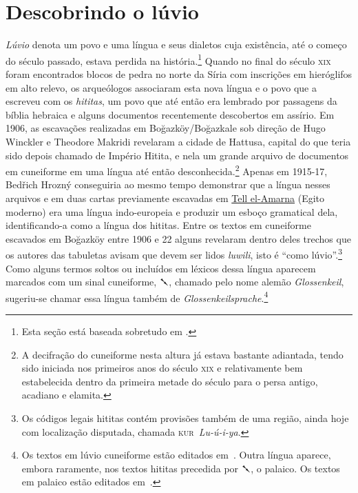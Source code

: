 
\section{Descobrindo o lúvio}

\emph{Lúvio} denota um povo e uma língua e seus dialetos cuja existência,
até o começo do século passado, estava perdida na história.\footnote{Esta seção
	está baseada sobretudo em \textcite{CHLI11,Melchert2003,Hoffner2008}.}
Quando no final do século \textsc{xix} foram encontrados blocos de pedra no
norte da Síria com inscrições em hieróglifos em alto relevo, os arqueólogos associaram esta
nova língua e o povo que a escreveu com os \emph{hititas}, um povo que até
então era lembrado por passagens da bíblia hebraica e alguns documentos
recentemente descobertos em assírio.
Em 1906, as escavações realizadas em Boğazköy\slash{}Boğazkale sob direção de
Hugo Winckler e Theodore Makridi revelaram a cidade de Hattusa,
capital do que teria sido depois chamado de Império Hitita, e nela um grande
arquivo de documentos em cuneiforme em uma língua até então
desconhecida.\footnote{A decifração do cuneiforme nesta altura já estava
	bastante adiantada, tendo sido iniciada nos primeiros anos do século
	\textsc{xix} e relativamente bem estabelecida dentro da primeira metade do
	século para o persa antigo, acadiano e elamita.}
Apenas em 1915-17, Bedřich Hrozný conseguiria ao mesmo tempo demonstrar que a
língua nesses arquivos e em duas cartas previamente escavadas em
\href{https://pleiades.stoa.org/places/149576487}{Tell el-Amarna}
(Egito moderno) era uma língua indo-europeia e produzir um esboço gramatical
dela, identificando-a como a língua dos hititas.
Entre os textos em cuneiforme escavados em Boğazköy entre 1906 e 22 alguns revelaram
dentro deles trechos que os autores das tabuletas avisam que devem ser lidos
\emph{luwili}, isto é ``como lúvio''.\footnote{Os códigos legais hititas
	contém provisões também de uma região, ainda hoje
	com localização disputada, chamada \mbox{\textsc{kur} \textit{Lu-ú-i-ya}}.}
Como alguns termos soltos ou incluídos em léxicos dessa língua
aparecem marcados com um sinal cuneiforme, \foreignlanguage{hittite}{𒃵}, chamado
pelo nome alemão \emph{Glossenkeil}, sugeriu-se chamar essa língua também de
\emph{Glossenkeilsprache}.\footnote{Os textos em lúvio cuneiforme estão
	editados em~\textcites{Starke1985}{YakubovichMouton2023}.
	Outra língua aparece, embora raramente,
	nos textos hititas precedida por \foreignlanguage{hittite}{𒃵}, o palaico. Os
	textos em palaico estão editados em~\textcite{Carruba1970}.}

